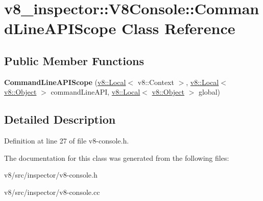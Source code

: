 \hypertarget{classv8__inspector_1_1V8Console_1_1CommandLineAPIScope}{}\section{v8\+\_\+inspector\+:\+:V8\+Console\+:\+:Command\+Line\+A\+P\+I\+Scope Class Reference}
\label{classv8__inspector_1_1V8Console_1_1CommandLineAPIScope}
\subsection*{Public Member Functions}
\begin{DoxyCompactItemize}
\item 
\mbox{\label{classv8__inspector_1_1V8Console_1_1CommandLineAPIScope_ae6eea7567e36318f9902374920d1f92a}} 
{\bfseries Command\+Line\+A\+P\+I\+Scope} (\mbox{\hyperlink{classv8_1_1Local}{v8\+::\+Local}}$<$ v8\+::\+Context $>$, \mbox{\hyperlink{classv8_1_1Local}{v8\+::\+Local}}$<$ \mbox{\hyperlink{classv8_1_1Object}{v8\+::\+Object}} $>$ command\+Line\+A\+PI, \mbox{\hyperlink{classv8_1_1Local}{v8\+::\+Local}}$<$ \mbox{\hyperlink{classv8_1_1Object}{v8\+::\+Object}} $>$ global)
\end{DoxyCompactItemize}


\subsection{Detailed Description}


Definition at line 27 of file v8-\/console.\+h.



The documentation for this class was generated from the following files\+:\begin{DoxyCompactItemize}
\item 
v8/src/inspector/v8-\/console.\+h\item 
v8/src/inspector/v8-\/console.\+cc\end{DoxyCompactItemize}

